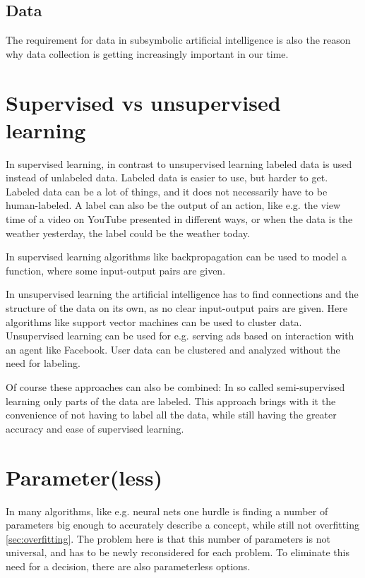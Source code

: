 \subsection{Data}
The requirement for data in subsymbolic artificial intelligence is also the reason why data collection is getting increasingly important in our time. 

\section{Supervised vs unsupervised learning} \cite[p695]{MA}
In supervised learning, in contrast to unsupervised learning labeled data is used instead of unlabeled data. 
Labeled data is easier to use, but harder to get. Labeled data can be a lot of things, and it does not necessarily have to be human-labeled. A label can also be the output of an action, like e.g. the view time of a video on YouTube presented in different ways, or when the data is the weather yesterday, the label could be the weather today.

In supervised learning algorithms like backpropagation can be used to model a function, where some input-output pairs are given.

In unsupervised learning the artificial intelligence has to find connections and the structure of the data on its own, as no clear input-output pairs are given.
Here algorithms like support vector machines can be used to cluster data. Unsupervised learning can be used for e.g. serving ads based on interaction with an agent like Facebook. User data can be clustered and analyzed without the need for labeling.

Of course these approaches can also be combined: In so called semi-supervised learning only parts of the data are labeled. This approach brings with it the convenience of not having to label all the data, while still having the greater accuracy and ease of supervised learning.

\section{Parameter(less)} \cite[p737]{MA}
In many algorithms, like e.g. neural nets one hurdle is finding a number of parameters big enough to accurately describe a concept, while still not  overfitting \autoref{sec:overfitting}. The problem here is that this number of parameters is not universal, and has to be newly reconsidered for each problem. To eliminate this need for a decision, there are also parameterless options. 

